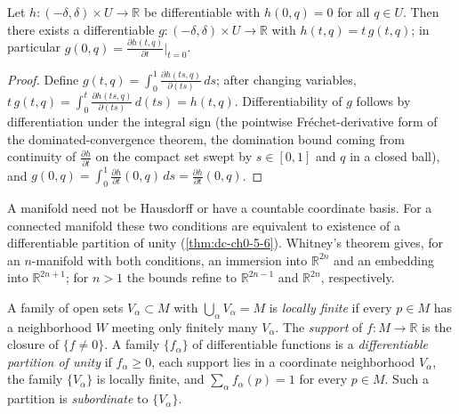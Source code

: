 \begin{lemma}
  \label{lem:dc-ch0-5-5}


  Let $h:(-\delta,\delta)\times U\to\mathbb{R}$ be differentiable with $h(0,q)=0$
  for all $q\in U$. Then there exists a differentiable
  $g:(-\delta,\delta)\times U\to\mathbb{R}$ with $h(t,q)=t\,g(t,q)$; in particular
  $g(0,q)=\frac{\partial h(t,q)}{\partial t}\big|_{t=0}$.
\end{lemma}
\begin{proof}
  \sketch

  Define $g(t,q)=\int_0^1\frac{\partial h(ts,q)}{\partial(ts)}\,ds$; after
  changing variables, $t\,g(t,q)=\int_0^t\frac{\partial h(ts,q)}{\partial(ts)}\,d(ts)=h(t,q)$.
  Differentiability of $g$ follows by differentiation under the integral sign
  (the pointwise Fréchet-derivative form of the dominated-convergence theorem, the
  domination bound coming from continuity of $\frac{\partial h}{\partial t}$ on the
  compact set swept by $s\in[0,1]$ and $q$ in a closed ball), and
  $g(0,q)=\int_0^1\frac{\partial h}{\partial t}(0,q)\,ds=\frac{\partial h}{\partial t}(0,q)$.
\end{proof}

A manifold need not be Hausdorff or have a countable coordinate basis. For a
connected manifold these two conditions are equivalent to existence of a
differentiable partition of unity (\cref{thm:dc-ch0-5-6}). Whitney's theorem
gives, for an $n$-manifold with both conditions, an immersion into
$\mathbb{R}^{2n}$ and an embedding into $\mathbb{R}^{2n+1}$; for $n>1$ the
bounds refine to $\mathbb{R}^{2n-1}$ and $\mathbb{R}^{2n}$, respectively.

A family of open sets $V_\alpha\subset M$ with $\bigcup_\alpha V_\alpha=M$ is
\emph{locally finite} if every $p\in M$ has a neighborhood $W$ meeting only
finitely many $V_\alpha$. The \emph{support} of $f:M\to\mathbb{R}$ is the
closure of $\{f\neq0\}$. A family $\{f_\alpha\}$ of differentiable functions is
a \emph{differentiable partition of unity} if $f_\alpha\ge0$, each support lies
in a coordinate neighborhood $V_\alpha$, the family $\{V_\alpha\}$ is locally
finite, and $\sum_\alpha f_\alpha(p)=1$ for every $p\in M$. Such a partition is
\emph{subordinate} to $\{V_\alpha\}$.

